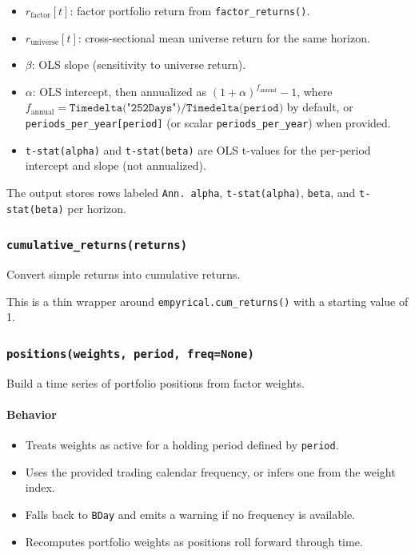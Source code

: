 \documentclass[11pt]{article}
\begin{document}
\begin{itemize}
  \item \(r_{\text{factor}}[t]\): factor portfolio return from \texttt{factor\_returns()}.
  \item \(r_{\text{universe}}[t]\): cross-sectional mean universe return for the same horizon.
  \item \(\beta\): OLS slope (sensitivity to universe return).
  \item \(\alpha\): OLS intercept, then annualized as
  \( (1 + \alpha)^{f_{\text{annual}}} - 1 \),
  where \(f_{\text{annual}}=\texttt{Timedelta("252Days")} / \texttt{Timedelta(period)}\) by default, or \texttt{periods\_per\_year[period]} (or scalar \texttt{periods\_per\_year}) when provided.
  \item \texttt{t-stat(alpha)} and \texttt{t-stat(beta)} are OLS t-values for the per-period intercept and slope (not annualized).
\end{itemize}

The output stores rows labeled \texttt{Ann. alpha}, \texttt{t-stat(alpha)}, \texttt{beta}, and \texttt{t-stat(beta)} per horizon.

\subsubsection{\texttt{cumulative\_returns(returns)}}
Convert simple returns into cumulative returns.

This is a thin wrapper around \texttt{empyrical.cum\_returns()} with a starting value of 1.

\subsubsection{\texttt{positions(weights, period, freq=None)}}
Build a time series of portfolio positions from factor weights.

\paragraph{Behavior}
\begin{itemize}
  \item Treats weights as active for a holding period defined by \texttt{period}.
  \item Uses the provided trading calendar frequency, or infers one from the weight index.
  \item Falls back to \texttt{BDay} and emits a warning if no frequency is available.
  \item Recomputes portfolio weights as positions roll forward through time.
\end{itemize}
\end{document}
